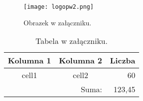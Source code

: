 \documentclass[
    bindingoffset=5mm,  %
    footnoteindent=3mm, %
    hyphenation=true    %
]{src/wut-thesis}
\begin{document}

\captionsetup[figure]{list=no}
\captionsetup[table]{list=no}

\clearpage
{}
\lipsum[1-3]
\begin{figure}[!h]
	\centering \texttt{[image: logopw2.png]}
	\caption{Obrazek w załączniku.}
\end{figure}
\lipsum[4-7]

\clearpage
{}
\lipsum[1-2]
\begin{table}[!h] \centering
    \caption{Tabela w załączniku.}
    \begin{tabular} {| c | c | r |} \hline
        Kolumna 1       & Kolumna 2 & Liczba \\ \hline\hline
        cell1           & cell2     & 60     \\ \hline
        \multicolumn{2}{|r|}{Suma:} & 123,45 \\ \hline
    \end{tabular}
\end{table}
\lipsum[3-4]

\end{document}
